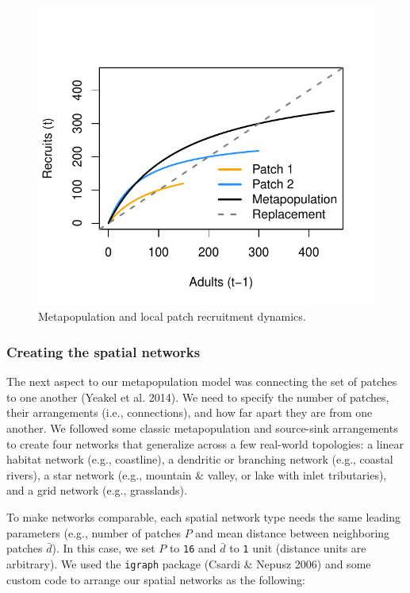 \documentclass[
]{article}
\begin{document}
\begin{figure}[H]

{\centering \includegraphics{Managing_for_ecological_surprises_in_metapopulations_files/figure-latex/recruit curves-1} 

}

\caption{Metapopulation and local patch recruitment dynamics.}\label{fig:recruit curves}
\end{figure}

\hypertarget{creating-the-spatial-networks}{%
\subsubsection{Creating the spatial
networks}\label{creating-the-spatial-networks}}

The next aspect to our metapopulation model was connecting the set of
patches to one another (Yeakel et al. 2014). We need to specify the
number of patches, their arrangements (i.e., connections), and how far
apart they are from one another. We followed some classic metapopulation
and source-sink arrangements to create four networks that generalize
across a few real-world topologies: a linear habitat network (e.g.,
coastline), a dendritic or branching network (e.g., coastal rivers), a
star network (e.g., mountain \& valley, or lake with inlet tributaries),
and a grid network (e.g., grasslands).

To make networks comparable, each spatial network type needs the same
leading parameters (e.g., number of patches \(P\) and mean distance
between neighboring patches \(\bar{d}\)). In this case, we set \(P\) to
\texttt{16} and \(\bar{d}\) to \texttt{1} unit (distance units are
arbitrary). We used the \texttt{igraph} package (Csardi \& Nepusz 2006)
and some custom code to arrange our spatial networks as the following:
\end{document}
